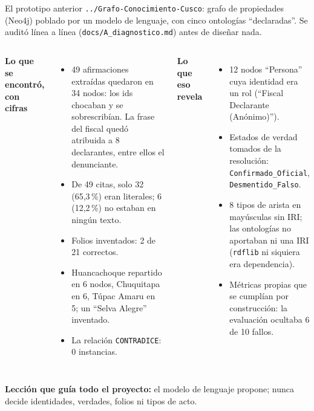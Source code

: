 \documentclass[aspectratio=169,10pt]{beamer}
\newcommand{\ttt}[1]{\texttt{\small #1}}
\begin{document}
\begin{frame}[shrink=15]{El prototipo anterior}
\small
\ttt{../Grafo-Conocimiento-Cusco}: grafo de propiedades (Neo4j) poblado por un modelo de lenguaje, con cinco
ontologías \enquote{declaradas}. Se auditó línea a línea (\ttt{docs/A\_diagnostico.md}) antes de diseñar nada.
\begin{columns}[T]
\textbf{Lo que se encontró, con cifras}
\begin{itemize}\footnotesize
\item 49 afirmaciones extraídas quedaron en \alert{34 nodos}: los ids chocaban y se sobrescribían. La frase del fiscal
      quedó atribuida a \alert{8 declarantes}, entre ellos el denunciante.
\item De 49 citas, solo 32 (\alert{65,3\,\%}) eran literales; 6 (\alert{12,2\,\%}) no estaban en ningún texto.
\item Folios inventados: \alert{2 de 21} correctos.
\item Huancachoque repartido en 6 nodos, Chuquitapa en 6, Túpac Amaru en 5; un \enquote{Selva Alegre} inventado.
\item La relación \ttt{CONTRADICE}: \alert{0 instancias}.
\end{itemize}
\textbf{Lo que eso revela}
\begin{itemize}\footnotesize
\item 12 nodos \enquote{Persona} cuya identidad era un rol (\enquote{Fiscal Declarante (Anónimo)}).
\item Estados de verdad tomados de la resolución: \ttt{Confirmado\_Oficial}, \ttt{Desmentido\_Falso}.
\item 8 tipos de arista en mayúsculas sin IRI; las ontologías no aportaban ni una IRI (\ttt{rdflib} ni siquiera era
      dependencia).
\item Métricas propias que se cumplían por construcción: la evaluación ocultaba 6 de 10 fallos.
\end{itemize}
\end{columns}
\medskip
\textbf{Lección que guía todo el proyecto:} el modelo de lenguaje propone; \alert{nunca} decide identidades, verdades, folios
ni tipos de acto.
\end{frame}
\end{document}
